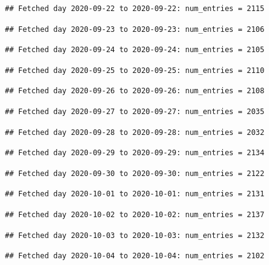 \documentclass[]{article}
\begin{document}
\begin{verbatim}
## Fetched day 2020-09-22 to 2020-09-22: num_entries = 2115
\end{verbatim}

\begin{verbatim}
## Fetched day 2020-09-23 to 2020-09-23: num_entries = 2106
\end{verbatim}

\begin{verbatim}
## Fetched day 2020-09-24 to 2020-09-24: num_entries = 2105
\end{verbatim}

\begin{verbatim}
## Fetched day 2020-09-25 to 2020-09-25: num_entries = 2110
\end{verbatim}

\begin{verbatim}
## Fetched day 2020-09-26 to 2020-09-26: num_entries = 2108
\end{verbatim}

\begin{verbatim}
## Fetched day 2020-09-27 to 2020-09-27: num_entries = 2035
\end{verbatim}

\begin{verbatim}
## Fetched day 2020-09-28 to 2020-09-28: num_entries = 2032
\end{verbatim}

\begin{verbatim}
## Fetched day 2020-09-29 to 2020-09-29: num_entries = 2134
\end{verbatim}

\begin{verbatim}
## Fetched day 2020-09-30 to 2020-09-30: num_entries = 2122
\end{verbatim}

\begin{verbatim}
## Fetched day 2020-10-01 to 2020-10-01: num_entries = 2131
\end{verbatim}

\begin{verbatim}
## Fetched day 2020-10-02 to 2020-10-02: num_entries = 2137
\end{verbatim}

\begin{verbatim}
## Fetched day 2020-10-03 to 2020-10-03: num_entries = 2132
\end{verbatim}

\begin{verbatim}
## Fetched day 2020-10-04 to 2020-10-04: num_entries = 2102
\end{verbatim}
\end{document}
